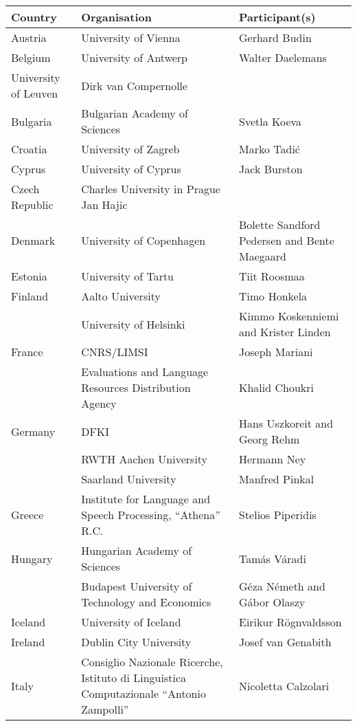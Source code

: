 \documentclass[]{../metanetpaper}
\begin{document}
\begin{Parallel}[c]{80mm}{80mm}
  \begin{tabular*}{\textwidth}{l|p{6cm}|p{4cm}}
    \hline \textbf{Country} & \textbf{Organisation} & \textbf{Participant(s)} \\ 
    \hline Austria & University of Vienna & Gerhard Budin\\
    \hline Belgium & University of Antwerp & Walter Daelemans\\
    \hline University of Leuven & Dirk van Compernolle & \\
    \hline Bulgaria & Bulgarian Academy of Sciences & Svetla Koeva \\
    \hline Croatia & University of Zagreb & Marko Tadić\\
    \hline Cyprus & University of Cyprus & Jack Burston\\
    \hline Czech Republic & Charles University in Prague Jan Hajic &\\
    \hline Denmark & University of Copenhagen & Bolette Sandford Pedersen and
    Bente Maegaard\\
    \hline Estonia & University of Tartu & Tiit Roosmaa\\
    \hline Finland & Aalto University & Timo Honkela\\
    \hline  & University of Helsinki & Kimmo Koskenniemi and
    Krister Linden \\
    \hline France & CNRS/LIMSI & Joseph Mariani \\
    \hline & Evaluations and Language Resources Distribution Agency & Khalid Choukri\\
    \hline Germany & DFKI & Hans Uszkoreit and Georg Rehm\\
    \hline & RWTH Aachen University & Hermann Ney\\
    \hline & Saarland University & Manfred Pinkal\\
    \hline Greece & Institute for Language and Speech Processing, “Athena” R.C. & Stelios Piperidis\\
    \hline Hungary & Hungarian Academy of Sciences & Tamás Váradi\\
    \hline & Budapest University of Technology and Economics & Géza Németh and Gábor Olaszy\\
    \hline Iceland & University of Iceland & Eirikur Rögnvaldsson\\
    \hline Ireland & Dublin City University & Josef van Genabith\\
    \hline Italy & Consiglio Nazionale Ricerche,  Istituto di Linguistica Computazionale “Antonio Zampolli” & Nicoletta Calzolari\\

\end{tabular*}
\end{Parallel}
\end{document}
